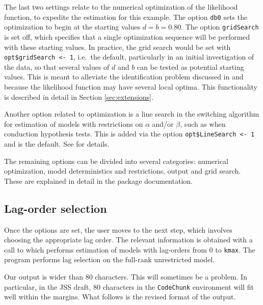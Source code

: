 \documentclass[article]{jss}
\newcommand{\fct}[1]{\code{#1()}}
\begin{document}
The last two settings relate to the numerical optimization of the likelihood function, to expedite the estimation for this example. 
The option \verb|db0| sets the optimization to begin at the starting values $d = b = 0.80$. 
The option \verb|gridSearch| is set off, which specifies that a single optimization sequence will be performed with these starting values. 
In practice, the grid search would be set with  \verb|opt$gridSearch <- 1|, i.e.~the default, particularly in an initial investigation of the data, 
so that several values of $d$ and $b$ can be tested as potential starting values. 
This is meant to alleviate the identification problem discussed in \citet[Section 2.3]{johniel2010} and \cite{Carlini2014} because the likelihood function may have several local optima. 
This functionality is described in detail in Section \ref{sec:extensions}. 

Another option related to optimization is a line search in the switching algorithm for estimation of models with restrictions on $\alpha$ and/or $\beta$, such as when conduction hypothesis tests. 
This is added via the option \verb|opt$LineSearch <- 1| and is the default. See \citet[Section 2.2]{Doornik2016} for details. 

The remaining options can be divided into several categories: numerical optimization, model deterministics and restrictions, output and grid search. 
These are explained in detail in the package documentation. 





\subsection{Lag-order selection}

Once the options are set, the user moves to the next step, which involves choosing the appropriate lag order. The relevant information is obtained with a call to \fct{FCVARlagSelect}
which performs estimation of models with lag-orders from $0$ to \verb|kmax|. The program performs lag selection on the full-rank unrestricted model. 

\begin{leftbar}
Our  output is wider than 80 characters. This will sometimes be a problem. 
In particular, in the JSS draft, 80 characters in the \verb|CodeChunk| environment will fit well within the margins.
What follows is the revised format of the output.
\end{leftbar}
\end{document}
